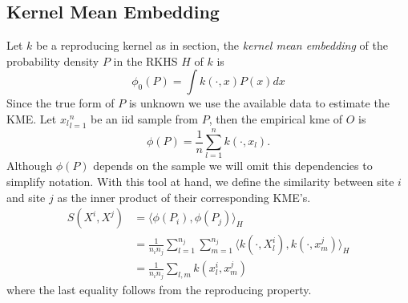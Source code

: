 \subsection{Kernel Mean Embedding}
\label{kme}
Let $k$ be a reproducing kernel as in section, the {\it kernel mean embedding} of the probability density $P$ in the RKHS $H$ of $k$ is
$$\phi_0(P) = \int k(\cdot,x)P(x) dx$$
Since the true form of $P$ is unknown we use the available data to estimate the KME. Let ${x_l}_{l=1}^n$ be an iid sample from $P$, then the empirical kme of $O$ is
$$\phi(P)=\frac{1}{n}\sum_{l=1}^n k(\cdot,x_l).$$
Although $\phi(P)$ depends on the sample we will omit this dependencies to simplify notation.
With this tool at hand, we define the similarity between site $i$ and site $j$ as the inner product of their corresponding KME's.
\begin{align*}
S(X^i,X^j)&=\langle \phi(P_i),\phi(P_j) \rangle_H \\
&= \frac{1}{n_i n_j} \sum_{l=1}^{n_j} \sum_{m=1}^{n_j} \langle k(\cdot,X_l^i),k(\cdot,x_m^j) \rangle_H \\
&= \frac{1}{n_i n_j} \sum_{l,m} k(x^i_l,x^j_m)
\end{align*}
where the last equality follows from the reproducing property. 
